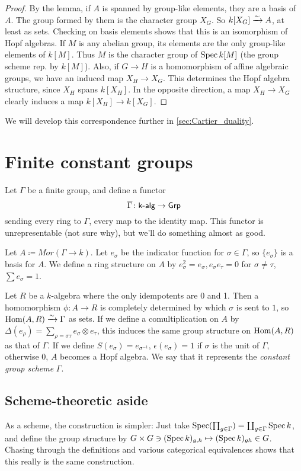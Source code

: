 \documentclass{memoir}
\begin{document}
\begin{proof}
	By the lemma, if $ A $ is spanned by group-like elements, they are a basis of $ A $. The group formed by them is the character group $ X_G $. So $ k[X_G]\xrightarrow{\sim} A $, at least as sets. Checking on basis elements shows that this is an isomorphism of Hopf algebras.
	If $ M $ is any abelian group, its elements are the only group-like elements of $ k[M] $. Thus $ M $ is the character group of $ \operatorname{Spec} k[M] $ (the group scheme rep. by $ k[M] $).
	Also, if $ G\to H $ is a homomorphism of affine algebraic groups, we have an induced map $ X_H\to X_G $. This determines the Hopf algebra structure, since $ X_H $ spans $ k[X_H] $. In the opposite direction, a map $ X_H\to X_G $ clearly induces a map $ k[X_H]\to k[X_G] $.
\end{proof}
We will develop this correspondence further in \cref{sec:Cartier_duality}.
\section{Finite constant groups}\label{sec:fin_const_gps}
Let $ \Gamma $ be a finite group, and define a functor \[ \overline{\Gamma}\colon \textsf{k-alg}\to {\normalfont\mathsf{Grp}} \] sending every ring to $ \Gamma $, every map to the identity map. This functor is unrepresentable (not sure why), but we'll do something almost as good.

Let $ A\coloneqq Mor(\Gamma\to k) $. Let $ e_\sigma $ be the indicator function for $ \sigma\in \Gamma $, so $ \{e_\sigma\} $ is a basis for $ A $. We define a ring structure on $ A $ by $ e_\sigma^2=e_\sigma, e_\sigma e_\tau =0 $ for $ \sigma\ne\tau $, $ \sum e_\sigma =1 $.

Let $ R $ be a $ k $-algebra where the only idempotents are 0 and 1. Then a homomorphism $ \phi\colon A\to R $ is completely determined by which $ \sigma $ is sent to $ 1 $, so $ \operatorname{Hom}(A,R)\xrightarrow{\sim} \Gamma $ as sets. If we define a comultiplication on $ A $ by $ \Delta(e_\rho)=\sum_{\rho=\sigma\tau}e_\sigma\otimes e_\tau$, this induces the same group structure on $ \operatorname{Hom}(A,R) $ as that of $ \Gamma $.
If we define $ S(e_\sigma)=e_{\sigma^{-1}} $, $ \epsilon(e_\sigma)=1 $ if $ \sigma $ is the unit of $ \Gamma $, otherwise $ 0 $, $ A $ becomes a Hopf algebra. We say that it represents the \emph{constant group scheme} $ \Gamma $.
\subsection{Scheme-theoretic aside}
As a scheme, the construction is simpler: Just take $ \operatorname{Spec}(\prod_{g\in \Gamma})=\coprod_{g\in\Gamma}\operatorname{Spec} k $, and define the group structure by $G\times G\ni (\operatorname{Spec} k)_{g,h} \mapsto (\operatorname{Spec} k)_{gh} \in G$. Chasing through the definitions and various categorical equivalences shows that this really is the same construction.
\end{document}
